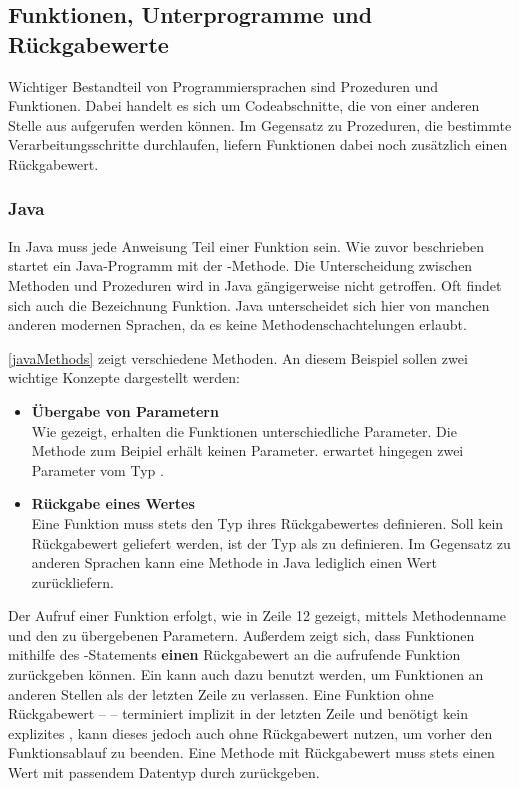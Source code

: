 \subsection{Funktionen, Unterprogramme und Rückgabewerte}\label{sec:functionsAndReturnValues}
Wichtiger Bestandteil von Programmiersprachen sind Prozeduren und Funktionen. Dabei handelt es sich um Codeabschnitte, die von einer anderen Stelle aus aufgerufen werden können. Im Gegensatz zu Prozeduren, die bestimmte Verarbeitungsschritte durchlaufen, liefern Funktionen dabei noch zusätzlich einen Rückgabewert.

\subsubsection*{Java}
In Java muss jede Anweisung Teil einer Funktion sein. Wie zuvor beschrieben startet ein Java-Programm mit der -Methode. Die Unterscheidung zwischen Methoden und Prozeduren wird in Java gängigerweise nicht getroffen. Oft findet sich auch die Bezeichnung Funktion. Java unterscheidet sich hier von manchen anderen modernen Sprachen, da es keine Methodenschachtelungen erlaubt.

\autoref{javaMethods} zeigt verschiedene Methoden. An diesem Beispiel sollen zwei wichtige Konzepte dargestellt werden: 
\begin{itemize}
    \item \textbf{Übergabe von Parametern}\\
    Wie gezeigt, erhalten die Funktionen unterschiedliche Parameter. Die Methode  zum Beipiel erhält keinen Parameter.  erwartet hingegen   zwei Parameter vom Typ .
    \item \textbf{Rückgabe eines Wertes}\\
    Eine Funktion muss stets den Typ ihres Rückgabewertes definieren. Soll kein Rückgabewert geliefert werden, ist der Typ als  zu definieren. Im Gegensatz zu anderen Sprachen kann eine Methode in Java lediglich einen Wert zurückliefern.
\end{itemize}
Der Aufruf einer Funktion erfolgt, wie in Zeile 12 gezeigt, mittels Methodenname und den zu übergebenen Parametern. Außerdem zeigt sich, dass Funktionen mithilfe des -Statements \textbf{einen} Rückgabewert an die aufrufende Funktion zurückgeben können. Ein  kann auch dazu benutzt werden, um Funktionen an anderen Stellen als der letzten Zeile zu verlassen. Eine Funktion ohne Rückgabewert --  -- terminiert implizit in der letzten Zeile und benötigt kein explizites , kann dieses jedoch auch ohne Rückgabewert nutzen, um vorher den Funktionsablauf zu beenden. Eine Methode mit Rückgabewert muss stets einen Wert mit passendem Datentyp durch  zurückgeben.


